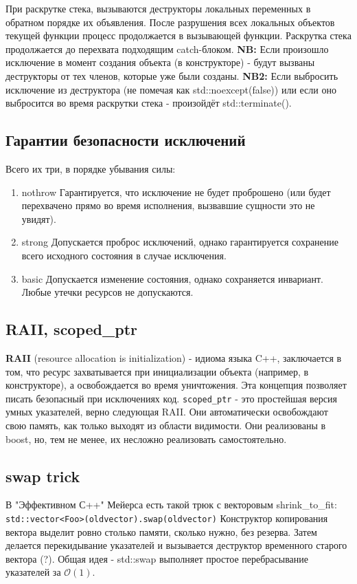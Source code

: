 \documentclass[15pt, a4paper]{article}
\newcommand{\nl}{\newline}
\begin{document}
При раскрутке стека, вызываются деструкторы локальных переменных в обратном порядке их объявления.
После разрушения всех локальных объектов текущей функции процесс продолжается в вызывающей функции. Раскрутка стека продолжается до перехвата подходящим catch-блоком. \nl
\textbf{NB:} Если произошло исключение в момент создания объекта (в конструкторе) - будут вызваны деструкторы от тех членов, которые уже были созданы. \nl
\textbf{NB2:} Если выбросить исключение из деструктора (не помечая как std::noexcept(false)) или если оно выбросится во время раскрутки стека - произойдёт std::terminate().
\subsection{Гарантии безопасности исключений}
Всего их три, в порядке убывания силы:
\begin{enumerate}
    \item nothrow \nl
    Гарантируется, что исключение не будет проброшено (или будет перехвачено прямо во время исполнения, вызвавшие сущности это не увидят).
    \item strong \nl
    Допускается проброс исключений, однако гарантируется сохранение всего исходного состояния в случае исключения.
    \item basic \nl
    Допускается изменение состояния, однако сохраняется инвариант. Любые утечки ресурсов не допускаются.
\end{enumerate}
\subsection{RAII, scoped\_ptr}
\textbf{RAII} (resource allocation is initialization) - идиома языка C++, заключается в том, что ресурс захватывается при инициализации объекта (например, в конструкторе),
а освобождается во время уничтожения. Эта концепция позволяет писать безопасный при исключениях код. \nl
\texttt{scoped\_ptr} - это простейшая версия умных указателей, верно следующая RAII. Они автоматически освобождают свою память, как только выходят из области видимости.
Они реализованы в boost, но, тем не менее, их несложно реализовать самостоятельно.
\subsection{swap trick}
В "Эффективном С++" Мейерса есть такой трюк с векторовым shrink\_to\_fit: \nl
\texttt{std::vector<Foo>(oldvector).swap(oldvector)} \nl
Конструктор копирования вектора выделит ровно столько памяти, сколько нужно, без резерва. Затем делается перекидывание указателей и вызывается деструктор временного старого вектора (?).\nl
Общая идея - std::swap выполняет простое перебрасывание указателей за $\mathcal{O}(1)$.
\end{document}
